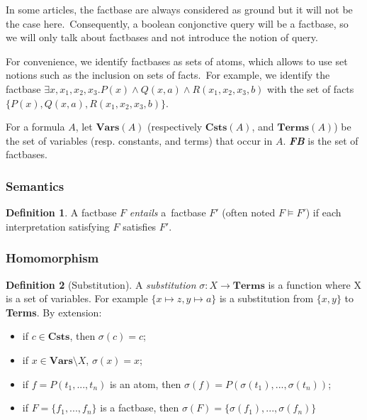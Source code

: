 \documentclass{article}
\theoremstyle{definition}
\newtheorem{definition}{Definition}[section]
\theoremstyle{remark}
\newcommand{\Vars}{\textbf{Vars}}
\newcommand{\Terms}{\textbf{Terms}}
\newcommand{\Csts}{\textbf{Csts}}
\begin{document}
In some articles, the factbase are always considered as ground but it will not be the case here.\ Consequently, a  boolean conjonctive query will be a factbase, so we will only talk about factbases and not introduce the notion of query.

For convenience, we identify factbases as sets of atoms, which allows to  use  set  notions  such  as  the  inclusion  on  sets  of  facts.\ For example, we identify the factbase $\exists x,x_{1},x_{2},x_{3}. P(x) \land Q(x,a) \land R(x_{1},x_{2},x_{3},b)$ with the set of facts $\{P(x),Q(x,a),R(x_{1},x_{2},x_{3},b)\}$.

For a formula $A$, let \emph{$\Vars(A)$} (respectively \emph{$\Csts(A)$}, and \emph{$\Terms(A)$}) be the set of variables (resp. constants, and terms) that occur in $A$. \emph{\textbf{FB}} is the set of factbases.

\subsubsection{Semantics}

\begin{definition}
A factbase $F$ \emph{entails} a\ factbase $F'$ (often noted $F \models F'$) if each interpretation satisfying $F$ satisfies $F'$.
\end{definition}	

\subsubsection{Homomorphism}

\begin{definition}[Substitution]
A \emph{substitution} $\sigma:X \to \Terms$ is a function where X is a set of variables. For example $\{x \mapsto z, y \mapsto a \}$ is a substitution from $\{x,y\}$ to \Terms. By extension: 
\begin{itemize}
\item if $c \in \Csts$, then $\sigma(c) = c$;
\item if $x \in \Vars \setminus X$, $\sigma(x) = x$;
\item if $f = P(t_1,...,t_n)$ is an atom, then $\sigma(f) = P(\sigma(t_1),...,\sigma(t_n))$;
\item if $F = \{f_1,...,f_n\}$ is a factbase, then $\sigma(F) = \{\sigma(f_1),...,\sigma(f_n)\}$
\end{itemize}
\end{definition}
\end{document}
